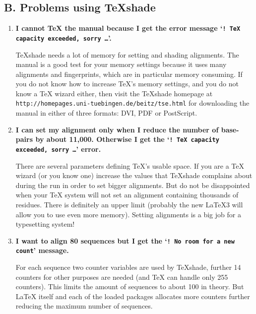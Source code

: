\documentclass[12pt]{article}
\begin{document}
\subsection*{B. Problems using \TeX{}shade}
\medskip

\begin{enumerate}
    
    \item
    
    \textbf{I cannot \TeX{} the manual because I get the error
    message `\texttt{!\ TeX capacity exceeded, sorry \ldots}'.}
    
    \TeX{}shade needs a lot of memory for setting and shading 
    alignments. The manual is a good test for your memory settings 
    because it uses many alignments and fingerprints, which are 
    in particular memory consuming. If you do not know how to increase 
    \TeX's memory settings, and you do not know a \TeX{} wizard either, then 
    visit the \TeX{}shade homepage at 
    \texttt{http://homepages.uni-tuebingen.de/beitz/tse.html} for 
    downloading the manual in either of three formats: DVI, PDF or 
    PostScript.
    
    
    \item
    
    \textbf{I can set my alignment only when I reduce the number of 
    base-pairs by about 11,000. Otherwise I get the `\texttt{!\ TeX 
    capacity exceeded, sorry \ldots}' error.}
    
    There are several parameters defining \TeX's
    usable space. If you are a \TeX{} wizard (or you know one) 
    increase the values that
    \TeX{}shade complains about during the run in order to set 
    bigger alignments. But do not be disappointed when your \TeX{} 
    system will not set an alignment containing thousands of residues. 
    There is definitely an upper limit (probably the new \LaTeX3 will 
    allow you to use even more memory). Setting alignments is a big job for a 
    typesetting system!
    
    
    \item
    
    \textbf{I want to align 80 sequences but I get the
    `\texttt{!\ No room for a new count}' message.}
    
    For each sequence two counter variables are used by \TeX{}shade, 
    further 14 counters for other purposes are needed (and \TeX{} 
    can handle only 255 counters). This limits the amount of sequences 
    to about 100 in theory. But \LaTeX{} itself and each of 
    the loaded packages allocates more counters further reducing the maximum 
    number of sequences.
    


\end{enumerate}
\end{document}
